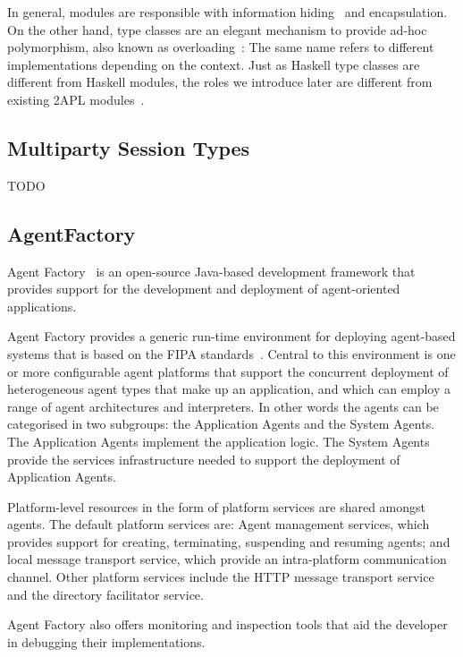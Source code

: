 \documentclass[a4paper,12pt,oneside,fleqn]{book} %
\theoremstyle{plain}
\theoremstyle{definition}
\theoremstyle{remark}
\begin{document}
In general, modules are responsible with information
hiding~\cite{DBLP:journals/cacm/Parnas72a} and encapsulation.  On the other
hand, type classes are an elegant mechanism to provide ad-hoc polymorphism,
also known as overloading~\cite{DBLP:conf/popl/WadlerB89}: The same name
refers to different implementations depending on the context.  Just as
Haskell type classes are different from Haskell modules, the roles we
introduce later are different from existing 2APL
modules~\cite{dblp:conf/prima/dastanims08}.


\subsection{Multiparty Session Types} %

TODO

\subsection{AgentFactory} %

Agent Factory~\cite{collier2002agent} is an open-source Java-based
development framework that provides support for the development and
deployment of agent-oriented applications.

Agent Factory provides a generic run-time environment for deploying
agent-based systems that is based on the FIPA
standards~\cite{poslad2000fipa}.  Central to this environment is one or
more configurable agent platforms that support the concurrent deployment of
heterogeneous agent types that make up an application, and which can employ
a range of agent architectures and interpreters. In other words the agents
can be categorised in two subgroups: the Application Agents and the System
Agents. The Application Agents implement the application logic. The System
Agents provide the services infrastructure needed to support the deployment
of Application Agents. 

Platform-level resources in the form of platform services are shared
amongst agents. The default platform services are: Agent management
services, which provides support for creating, terminating, suspending and
resuming agents; and local message transport service, which provide an
intra-platform communication channel. Other platform services include the
HTTP message transport service and the directory facilitator service.

Agent Factory also offers monitoring and inspection tools that aid the
developer in debugging their implementations.
\end{document}
